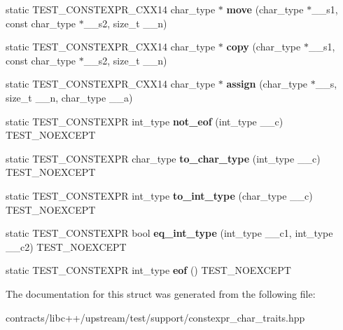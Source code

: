 \begin{DoxyCompactItemize}
\item 
\mbox{\label{structconstexpr__char__traits_ad1e1413e93b73252eb6388e1f2aad7d9}} 
static T\+E\+S\+T\+\_\+\+C\+O\+N\+S\+T\+E\+X\+P\+R\+\_\+\+C\+X\+X14 char\+\_\+type $\ast$ {\bfseries move} (char\+\_\+type $\ast$\+\_\+\+\_\+s1, const char\+\_\+type $\ast$\+\_\+\+\_\+s2, size\+\_\+t \+\_\+\+\_\+n)
\item 
\mbox{\label{structconstexpr__char__traits_a5a194a7907dfde5965dc6e390234e64e}} 
static T\+E\+S\+T\+\_\+\+C\+O\+N\+S\+T\+E\+X\+P\+R\+\_\+\+C\+X\+X14 char\+\_\+type $\ast$ {\bfseries copy} (char\+\_\+type $\ast$\+\_\+\+\_\+s1, const char\+\_\+type $\ast$\+\_\+\+\_\+s2, size\+\_\+t \+\_\+\+\_\+n)
\item 
\mbox{\label{structconstexpr__char__traits_adadaa8561026af8421dbf2e9fad46765}} 
static T\+E\+S\+T\+\_\+\+C\+O\+N\+S\+T\+E\+X\+P\+R\+\_\+\+C\+X\+X14 char\+\_\+type $\ast$ {\bfseries assign} (char\+\_\+type $\ast$\+\_\+\+\_\+s, size\+\_\+t \+\_\+\+\_\+n, char\+\_\+type \+\_\+\+\_\+a)
\item 
\mbox{\label{structconstexpr__char__traits_afdfabf3fcb61d1288ee0531187272bb3}} 
static T\+E\+S\+T\+\_\+\+C\+O\+N\+S\+T\+E\+X\+PR int\+\_\+type {\bfseries not\+\_\+eof} (int\+\_\+type \+\_\+\+\_\+c) T\+E\+S\+T\+\_\+\+N\+O\+E\+X\+C\+E\+PT
\item 
\mbox{\label{structconstexpr__char__traits_aa0be2f322b22e372277b71a7d4910174}} 
static T\+E\+S\+T\+\_\+\+C\+O\+N\+S\+T\+E\+X\+PR char\+\_\+type {\bfseries to\+\_\+char\+\_\+type} (int\+\_\+type \+\_\+\+\_\+c) T\+E\+S\+T\+\_\+\+N\+O\+E\+X\+C\+E\+PT
\item 
\mbox{\label{structconstexpr__char__traits_a580df17dfdc48f553683178c688338fd}} 
static T\+E\+S\+T\+\_\+\+C\+O\+N\+S\+T\+E\+X\+PR int\+\_\+type {\bfseries to\+\_\+int\+\_\+type} (char\+\_\+type \+\_\+\+\_\+c) T\+E\+S\+T\+\_\+\+N\+O\+E\+X\+C\+E\+PT
\item 
\mbox{\label{structconstexpr__char__traits_a61278d6f6d193decb55deaa987d48e17}} 
static T\+E\+S\+T\+\_\+\+C\+O\+N\+S\+T\+E\+X\+PR bool {\bfseries eq\+\_\+int\+\_\+type} (int\+\_\+type \+\_\+\+\_\+c1, int\+\_\+type \+\_\+\+\_\+c2) T\+E\+S\+T\+\_\+\+N\+O\+E\+X\+C\+E\+PT
\item 
\mbox{\label{structconstexpr__char__traits_ab79dd0e2c76e7814891974005061d909}} 
static T\+E\+S\+T\+\_\+\+C\+O\+N\+S\+T\+E\+X\+PR int\+\_\+type {\bfseries eof} () T\+E\+S\+T\+\_\+\+N\+O\+E\+X\+C\+E\+PT
\end{DoxyCompactItemize}


The documentation for this struct was generated from the following file\+:\begin{DoxyCompactItemize}
\item 
contracts/libc++/upstream/test/support/constexpr\+\_\+char\+\_\+traits.\+hpp\end{DoxyCompactItemize}
